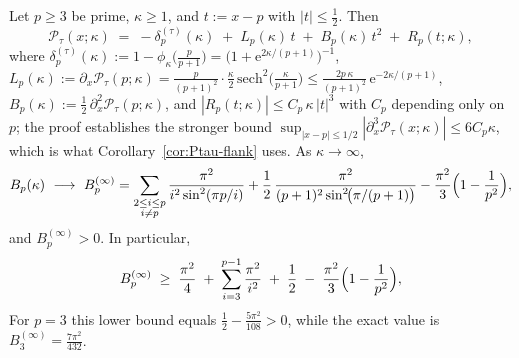 \begin{lemma}\label{lem:Ptau-local-lb}
Let $p\ge 3$ be prime, $\kappa\ge1$, and $t:=x-p$ with $|t|\le\tfrac12$. Then
\[
\mathcal P_\tau(x;\kappa)\;=\;-\delta_p^{(\tau)}(\kappa)\;+\;L_p(\kappa)\,t\;+\;B_p(\kappa)\,t^2\;+\;R_p(t;\kappa),
\]
where $\delta_p^{(\tau)}(\kappa):=1-\phi_\kappa\bigl(\tfrac{p}{p+1}\bigr)=\bigl(1+\mathrm e^{2\kappa/(p+1)}\bigr)^{-1}$, $L_p(\kappa):=\partial_x\mathcal P_\tau(p;\kappa)=\frac{p}{(p+1)^2}\cdot\frac{\kappa}{2}\,\mathrm{sech}^2\!\bigl(\frac{\kappa}{p+1}\bigr)\le\frac{2p\,\kappa}{(p+1)^2}\,\mathrm e^{-2\kappa/(p+1)}$, $B_p(\kappa):=\tfrac12\,\partial_x^2\mathcal P_\tau(p;\kappa)$, and $|R_p(t;\kappa)|\le C_p\,\kappa\,|t|^3$ with $C_p$ depending only on $p$; the proof establishes the stronger bound $\sup_{|x-p|\le1/2}|\partial_x^3\mathcal P_\tau(x;\kappa)|\le 6C_p\kappa$, which is what Corollary~\ref{cor:Ptau-flank} uses.
As $\kappa\to\infty$,
\[
B_p(\kappa)\ \longrightarrow\ B_p^{(\infty)}
=\sum_{\substack{2\le i\le p\\ i\neq p}}\frac{\pi^2}{i^2\sin^2(\pi p/i)}
+\frac{1}{2}\,\frac{\pi^2}{(p+1)^2\sin^2\!\bigl(\pi/(p+1)\bigr)}
-\frac{\pi^2}{3}\Bigl(1-\frac{1}{p^2}\Bigr),
\]
and $B_p^{(\infty)}>0$. In particular,
\[
B_p^{(\infty)} \;\ge\; \frac{\pi^2}{4} \;+\; \sum_{i=3}^{p-1}\frac{\pi^2}{i^2} \;+\; \frac12 \;-\; \frac{\pi^2}{3}\Bigl(1-\frac{1}{p^2}\Bigr),
\]
For $p=3$ this lower bound equals $\frac12-\frac{5\pi^2}{108}>0$, while the exact value is $B_3^{(\infty)}=\frac{7\pi^2}{432}$.
\end{lemma}

